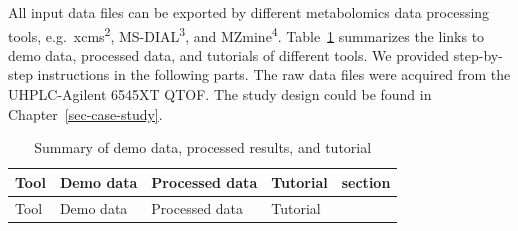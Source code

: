 \documentclass[
  letterpaper,
  DIV=11,
  numbers=noendperiod]{scrreprt}
\begin{document}
All input data files can be exported by different metabolomics data
processing tools, e.g.~xcms\textsuperscript{2},
MS-DIAL\textsuperscript{3}, and MZmine\textsuperscript{4}.
Table~\ref{tbl-table2-1} summarizes the links to demo data, processed
data, and tutorials of different tools. We provided step-by-step
instructions in the following parts. The raw data files were acquired
from the UHPLC-Agilent 6545XT QTOF. The study design could be found in
Chapter~\ref{sec-case-study}.

\begin{longtable}[]{@{}
  >{\raggedright\arraybackslash}p{}
  >{\raggedright\arraybackslash}p{}
  >{\raggedright\arraybackslash}p{}
  >{\raggedright\arraybackslash}p{}
  >{\raggedright\arraybackslash}p{}@{}}
\caption{Summary of demo data, processed results, and
tutorial}\label{tbl-table2-1}\tabularnewline
\toprule\noalign{}
\begin{minipage}[b]{\linewidth}\raggedright
Tool
\end{minipage} & \begin{minipage}[b]{\linewidth}\raggedright
Demo data
\end{minipage} & \begin{minipage}[b]{\linewidth}\raggedright
Processed data
\end{minipage} & \begin{minipage}[b]{\linewidth}\raggedright
Tutorial
\end{minipage} & \begin{minipage}[b]{\linewidth}\raggedright
section
\end{minipage} \\
\midrule\noalign{}
\endfirsthead
\toprule\noalign{}
\begin{minipage}[b]{\linewidth}\raggedright
Tool
\end{minipage} & \begin{minipage}[b]{\linewidth}\raggedright
Demo data
\end{minipage} & \begin{minipage}[b]{\linewidth}\raggedright
Processed data
\end{minipage} & \begin{minipage}[b]{\linewidth}\raggedright
Tutorial
\end{minipage} & \begin{minipage}[b]{\linewidth}\raggedright

\end{minipage}
\end{longtable}
\end{document}
